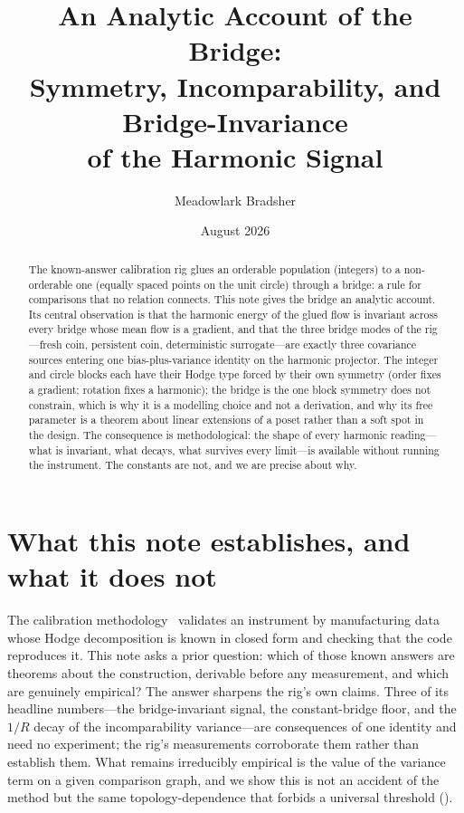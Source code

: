 \documentclass[11pt,a4paper]{article}
\title{An Analytic Account of the Bridge:\\
Symmetry, Incomparability, and Bridge-Invariance\\
of the Harmonic Signal}
\author{Meadowlark Bradsher}
\date{August 2026}
\theoremstyle{definition}
\theoremstyle{remark}
\begin{document}
\maketitle

\begin{abstract}
The known-answer calibration rig glues an orderable population (integers) to a non-orderable one (equally spaced points on the unit circle) through a bridge: a rule for comparisons that no relation connects. This note gives the bridge an analytic account. Its central observation is that the harmonic energy of the glued flow is invariant across every bridge whose mean flow is a gradient, and that the three bridge modes of the rig---fresh coin, persistent coin, deterministic surrogate---are exactly three covariance sources entering one bias-plus-variance identity on the harmonic projector. The integer and circle blocks each have their Hodge type forced by their own symmetry (order fixes a gradient; rotation fixes a harmonic); the bridge is the one block symmetry does not constrain, which is why it is a modelling choice and not a derivation, and why its free parameter is a theorem about linear extensions of a poset rather than a soft spot in the design. The consequence is methodological: the shape of every harmonic reading---what is invariant, what decays, what survives every limit---is available without running the instrument. The constants are not, and we are precise about why.
\end{abstract}

\section{What this note establishes, and what it does not}

The calibration methodology~\cite{bradsher2026} validates an instrument by manufacturing data whose Hodge decomposition is known in closed form and checking that the code reproduces it. This note asks a prior question: which of those known answers are theorems about the construction, derivable before any measurement, and which are genuinely empirical? The answer sharpens the rig's own claims. Three of its headline numbers---the bridge-invariant signal, the constant-bridge floor, and the $1/R$ decay of the incomparability variance---are consequences of one identity and need no experiment; the rig's measurements corroborate them rather than establish them. What remains irreducibly empirical is the value of the variance term on a given comparison graph, and we show this is not an accident of the method but the same topology-dependence that forbids a universal threshold (\cite[Principle 3]{bradsher2026}).
\end{document}
